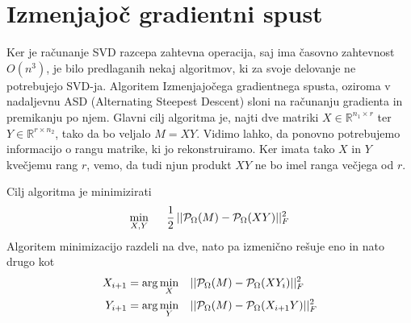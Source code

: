 \section{Izmenjajoč gradientni spust}
Ker je računanje SVD razcepa zahtevna operacija, saj ima časovno zahtevnost
$O(n^3)$, je bilo predlaganih nekaj algoritmov, ki za svoje delovanje ne potrebujejo SVD-ja. Algoritem Izmenjajočega gradientnega spusta, oziroma v nadaljevnu ASD (Alternating Steepest Descent) sloni na računanju gradienta in premikanju po njem. Glavni cilj algoritma je, najti dve matriki $X \in \mathbb{R}^{n_1 \times r}$ ter $Y \in \mathbb{R}^{r \times n_2}$, tako da bo veljalo $M = XY$. Vidimo lahko, da ponovno potrebujemo informacijo o rangu matrike, ki jo rekonstruiramo. Ker imata tako $X$ in $Y$ kvečjemu rang $r$, vemo, da tudi njun produkt $XY$ ne bo imel ranga večjega od $r$. 

Cilj algoritma je minimizirati
\[
    \min_{X, Y} \hspace{0.5cm} \frac{1}{2}\, ||\mathcal{P}_\Omega(M) - \mathcal{P}_\Omega(XY)||^2_F
\] 
Algoritem minimizacijo razdeli na dve, nato pa izmenično rešuje eno in nato drugo kot 
\begin{align*}
    X_{i+1} &= \arg \min_{X} \hspace{0.3cm} ||\mathcal{P}_\Omega(M) - \mathcal{P}_\Omega(XY_i)||^2_F \\
    Y_{i+1} &= \arg \min_{Y} \hspace{0.3cm} ||\mathcal{P}_\Omega(M) - \mathcal{P}_\Omega(X_{i+1}Y)||^2_F
\end{align*}
\cite{AST-TK15}

